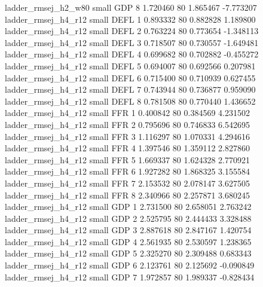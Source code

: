      ladder_rmsej_h2_w80      small      GDP                 8 1.720460 80       1.865467          -7.773207
     ladder_rmsej_h4_r12      small     DEFL                 1 0.893332 80       0.882828           1.189800
     ladder_rmsej_h4_r12      small     DEFL                 2 0.763224 80       0.773654          -1.348113
     ladder_rmsej_h4_r12      small     DEFL                 3 0.718507 80       0.730557          -1.649481
     ladder_rmsej_h4_r12      small     DEFL                 4 0.699682 80       0.702882          -0.455272
     ladder_rmsej_h4_r12      small     DEFL                 5 0.694007 80       0.692566           0.207981
     ladder_rmsej_h4_r12      small     DEFL                 6 0.715400 80       0.710939           0.627455
     ladder_rmsej_h4_r12      small     DEFL                 7 0.743944 80       0.736877           0.959090
     ladder_rmsej_h4_r12      small     DEFL                 8 0.781508 80       0.770440           1.436652
     ladder_rmsej_h4_r12      small      FFR                 1 0.400842 80       0.384569           4.231502
     ladder_rmsej_h4_r12      small      FFR                 2 0.795696 80       0.746833           6.542695
     ladder_rmsej_h4_r12      small      FFR                 3 1.116297 80       1.070331           4.294616
     ladder_rmsej_h4_r12      small      FFR                 4 1.397546 80       1.359112           2.827860
     ladder_rmsej_h4_r12      small      FFR                 5 1.669337 80       1.624328           2.770921
     ladder_rmsej_h4_r12      small      FFR                 6 1.927282 80       1.868325           3.155584
     ladder_rmsej_h4_r12      small      FFR                 7 2.153532 80       2.078147           3.627505
     ladder_rmsej_h4_r12      small      FFR                 8 2.340966 80       2.257871           3.680245
     ladder_rmsej_h4_r12      small      GDP                 1 2.731500 80       2.658051           2.763242
     ladder_rmsej_h4_r12      small      GDP                 2 2.525795 80       2.444433           3.328488
     ladder_rmsej_h4_r12      small      GDP                 3 2.887618 80       2.847167           1.420754
     ladder_rmsej_h4_r12      small      GDP                 4 2.561935 80       2.530597           1.238365
     ladder_rmsej_h4_r12      small      GDP                 5 2.325270 80       2.309488           0.683343
     ladder_rmsej_h4_r12      small      GDP                 6 2.123761 80       2.125692          -0.090849
     ladder_rmsej_h4_r12      small      GDP                 7 1.972857 80       1.989337          -0.828434
